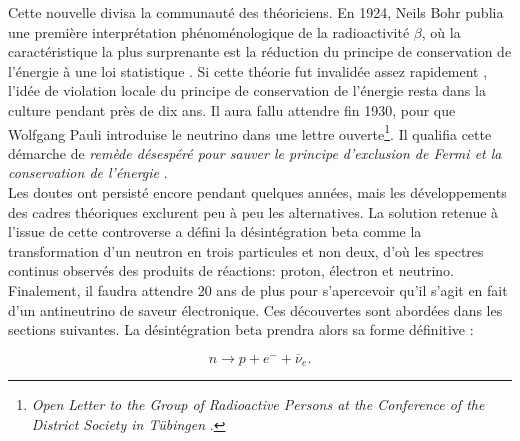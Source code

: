 Cette nouvelle divisa la communauté des théoriciens. En 1924, Neils Bohr publia une première interprétation phénoménologique de la radioactivité $\beta$, où la caractéristique la plus surprenante est la réduction du principe de conservation de l'énergie à une loi statistique \cite{doi:10.1080/14786442408565262}. Si cette théorie fut invalidée assez rapidement \cite{Bothe1925}, l'idée de violation locale du principe de conservation de l'énergie resta dans la culture pendant près de dix ans. Il aura fallu attendre fin 1930, pour que Wolfgang Pauli introduise le neutrino dans une lettre ouverte\footnote{\og \textit{Open Letter to the Group of Radioactive Persons at the Conference of the District Society in T\"ubingen} \fg{} \cite{Pauli:2013kg}.}. Il qualifia cette démarche de \og \textit{remède désespéré pour sauver le principe d'exclusion de Fermi et la conservation de l'énergie}\fg{} \cite{Pauli:2013kg}.\\

Les doutes ont persisté encore pendant quelques années, mais les développements des cadres théoriques exclurent peu à peu les alternatives. La solution retenue à l'issue de cette controverse a défini la désintégration beta comme la transformation d'un neutron en trois particules et non deux, d'où les spectres continus observés des produits de réactions: proton, électron et neutrino. Finalement, il faudra attendre 20 ans de plus pour s'apercevoir qu'il s'agit en fait d'un antineutrino de saveur électronique. Ces découvertes sont abordées dans les sections suivantes. La désintégration beta prendra alors sa forme définitive :

\begin{equation}
    n \rightarrow p + e^- + \overline{\nu}_e.
\end{equation}

\bigbreak






